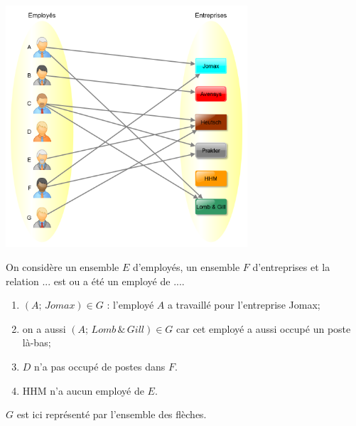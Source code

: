 \documentclass[a4paper,12pt,french]{book}
\begin{document}
\begin{exemple}
\begin{center}
\includegraphics[width=9cm]{img/graphe_relation_binaire.png}
\end{center}
On considère un ensemble $E$ d'employés, un ensemble $F$ d'entreprises et la relation \og ... est ou a été un employé de ...\fg{}.
\begin{enumerate}[--]
	\item 	$(A;\,Jomax)\in G$ : l'employé $A$ a travaillé pour l'entreprise Jomax;
	\item 	on a aussi $(A;\,Lomb\,\&\,Gill)\in G$ car cet employé a aussi occupé un poste là-bas;
	\item 	$D$ n'a pas occupé de postes dans $F$.
	\item 	HHM n'a aucun employé de $E$.
\end{enumerate}
$G$ est ici représenté par l'ensemble des flèches.
\end{exemple}
\end{document}
